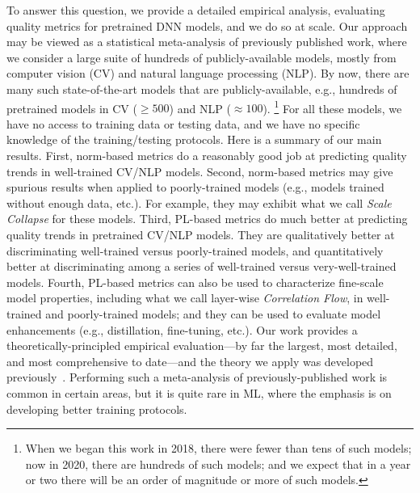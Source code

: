 To answer this question, we provide a detailed empirical analysis, evaluating quality metrics for pretrained DNN models, and we do so at scale.
Our approach may be viewed as a statistical meta-analysis of previously published work, where we consider a large suite of hundreds of publicly-available models, mostly from computer vision (CV) and natural language processing (NLP).
By now, there are many such state-of-the-art models that are publicly-available, e.g., 
hundreds of pretrained models in CV ($\ge 500$) and NLP ($\approx 100$).%
\footnote{When we began this work in 2018, there were fewer than tens of such models; now in 2020, there are hundreds of such models; and we expect that in a year or two there will be an order of magnitude or more of such models.}
For all these models, we have no access to training data or testing data, and we have no specific knowledge of the training/testing protocols. 
%
Here is a summary of our main results.
First, norm-based metrics do a reasonably good job at predicting quality trends in well-trained CV/NLP models.
Second, norm-based metrics may give spurious results when applied to poorly-trained models (e.g., models trained without enough data, etc.).
For example, they may exhibit what we call \emph{Scale Collapse} for these models. 
Third, PL-based metrics do much better at predicting quality trends in pretrained CV/NLP models.  
They are qualitatively better at discriminating well-trained versus poorly-trained models, and quantitatively better at discriminating among a series of well-trained versus very-well-trained models.
Fourth, PL-based metrics can also be used to characterize fine-scale model properties, including what we call layer-wise \emph{Correlation Flow}, in well-trained and poorly-trained models; and they can be used to evaluate model enhancements (e.g., distillation, fine-tuning, etc.).
%
Our work provides a theoretically-principled empirical evaluation---by far the largest, most detailed, and most comprehensive to date---and the theory we apply was developed previously~\cite{MM18_TR, MM19_HTSR_ICML, MM20_SDM}.
Performing such a meta-analysis of previously-published work is common in certain areas, but it is quite rare in ML, where the emphasis is on developing better training protocols.


